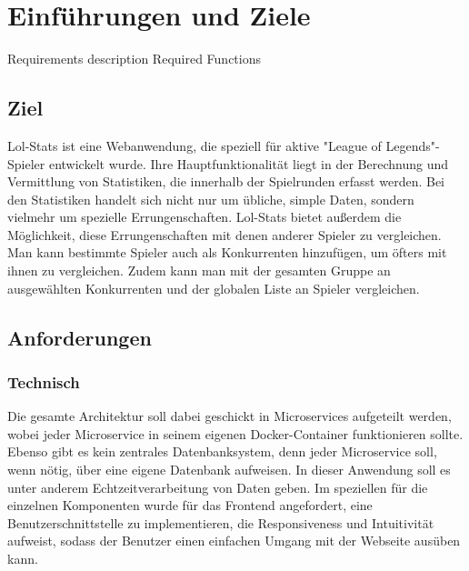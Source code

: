 \section{Einführungen und Ziele}
Requirements description
Required Functions

\subsection{Ziel}

Lol-Stats ist eine Webanwendung, die speziell für aktive "League of Legends"-Spieler entwickelt wurde. Ihre Hauptfunktionalität liegt in der Berechnung und Vermittlung
von Statistiken, die innerhalb der Spielrunden erfasst werden. Bei den Statistiken handelt sich nicht nur um übliche, simple Daten, sondern vielmehr um spezielle Errungenschaften. 
Lol-Stats bietet außerdem die Möglichkeit, diese Errungenschaften mit denen anderer Spieler zu vergleichen. Man kann bestimmte Spieler auch als Konkurrenten hinzufügen, um öfters mit ihnen zu vergleichen.
Zudem kann man mit der gesamten Gruppe an ausgewählten Konkurrenten und der globalen Liste an Spieler vergleichen.

\subsection{Anforderungen}

\subsubsection{Technisch}

Die gesamte Architektur soll dabei geschickt in Microservices aufgeteilt werden, wobei jeder Microservice in seinem eigenen Docker-Container funktionieren sollte. 
Ebenso gibt es kein zentrales Datenbanksystem, denn jeder Microservice soll, wenn nötig, über eine eigene Datenbank aufweisen. 
In dieser Anwendung soll es unter anderem Echtzeitverarbeitung von Daten geben.
Im speziellen für die einzelnen Komponenten wurde für das Frontend angefordert, eine Benutzerschnittstelle zu implementieren, die Responsiveness und Intuitivität aufweist, sodass der Benutzer einen einfachen Umgang mit der Webseite ausüben kann.
